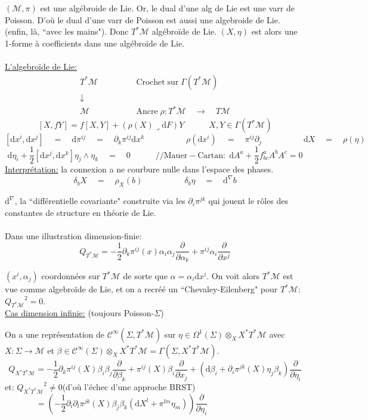 \documentclass[a4paper,11pt]{article}
\renewcommand{\d}{{\mathrm{d}}}
\newcommand{\dr}[2]{\frac{\partial {#1}}{\partial{#2}}}
\begin{document}
$(\mathcal{M},\pi)$ est une algébroide de Lie. Or, le dual d'une alg de Lie est une varr de Poisson. D'où le dual d'une varr de Poisson est aussi une algebroide de Lie. (enfin, là, ``avec les mains"). Donc $T^*\mathcal M$ algébroïde de Lie. $(X,\eta)$ est alors une 1-forme à coefficients dans une algébroïde de Lie.\\\\
\underline{L'algebroïde de Lie:}
$$\begin{matrix}
T^*\mathcal{M} &\quad \quad \quad & \mathrm{Crochet}\;\mathrm{sur}\; \Gamma(T^*\mathcal{M})\\
\downarrow\\
\mathcal{M} && \mathrm{Ancre}\;\rho: T^*\mathcal{M} \quad \longrightarrow \quad T\mathcal{M}
\end{matrix}$$
$$[X,fY] = f[X,Y] + (\rho(X)\lrcorner \d F)Y \quad\quad\quad X,Y\in\Gamma(T^*\mathcal{M})$$
$$[\d x^i, \d x^j] \quad=\quad \d \pi^{ij} \quad=\quad \partial_k \pi^{ij} \d x^k
\quad\quad\quad\quad\quad\rho(\d x^i) \quad=\quad \pi^{ij}\partial_j\quad\quad\quad\quad\quad
\d X \quad=\quad \rho(\eta)$$
$$\d\eta_i + \frac12[\d x^j, \d x^k] \eta_j\wedge\eta_k \quad = \quad 0 \quad\quad\quad /\!/\mathrm{Mauer}-\mathrm{Cartan}: \; \d A^a + \frac12 f^a_{bc}A^bA^c = 0$$
\underline{Interprétation:} la connexion a ne courbure nulle dans l'espace des phases.
$$\delta_b X \quad=\quad \rho_X (b) \quad\quad\quad\quad\quad \delta_b \eta \quad = \quad \d^\nabla b$$

$\d^\nabla$, la ``différentielle covariante"  construite via les $\partial_i \pi^{jk}$ qui jouent le rôles des constantes de structure en théorie de Lie.\\ \\
Dans une illustration dimension-finie:
$$Q_{T^*\mathcal{M}} = -\frac12 \partial_k \pi^{ij}(x) \alpha_i\alpha_j \dr{}{\alpha_k} + \pi^{ij} \alpha_i \dr{}{x^j}$$

$(x^i,\alpha_j)$ coordonnées sur $T^*\mathcal{M}$ de sorte que $\alpha = \alpha_i \d x^i$. On voit alors $T^*\mathcal{M}$ est vue comme algebroïde de Lie, et on a recréé un ``Chevaley-Eilenberg" pour $T^*\mathcal{M}$: ${Q_{T^*\mathcal{M}}}^2 = 0$.\\

\noindent\underline{Cas dimension infinie:} (toujours Poisson-$\Sigma$)

On a une représentation de $\mathcal{C}^\infty(\Sigma, T^*\mathcal{M})$ sur $\eta \in \Omega^1(\Sigma)\otimes_X X^*T^*\mathcal M$ avec $X:\Sigma\to\mathcal{M}$ et $\beta \in \mathcal{C}^\infty(\Sigma)\otimes_X X^*T^*\mathcal{M} = \Gamma(\Sigma,X^*T^*\mathcal{M})$.
$$Q_{X^*T^*\mathcal M} = -\frac12 \partial_k \pi^{ij}(X) \beta_i\beta_j\dr{}{\beta_k} + \pi^{ij}(X) \beta_i \dr{}{x_j} + (\d \beta_i + \partial_i \pi^{jk}(X)\eta_j \beta_k) \dr{}{\eta_i}$$
et: \quad ${Q_{X^*T^*\mathcal{M}}}^2 \ne 0$\quad\quad (d'où l'échec d'une approche BRST)
$$=\left(-\frac12 \partial_i \partial_l \pi^{jk}(X) \beta_j\beta_k(\d X^l + \pi^{lm} \eta_m)\right)\dr{}{\eta_i} \quad\quad\quad\quad\quad\quad\quad\quad$$
\end{document}
